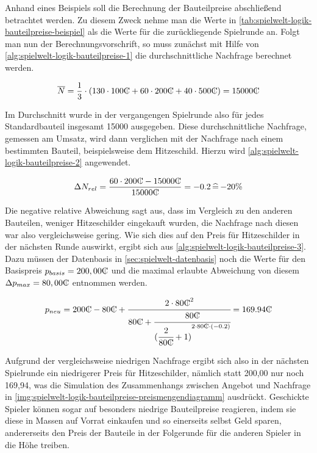 Anhand eines Beispiels soll die Berechnung der Bauteilpreise abschließend betrachtet werden. Zu diesem Zweck nehme man die Werte in \ref{tab:spielwelt-logik-bauteilpreise-beispiel} als die Werte für die zurückliegende Spielrunde an. Folgt man nun der Berechnungsvorschrift, so muss zunächst mit Hilfe von \ref{alg:spielwelt-logik-bauteilpreise-1} die durchschnittliche Nachfrage berechnet werden.

\newcommand{\tc}{\text{\curr}}
\begin{equation}
     \overline{N} = \frac{1}{3} \cdot {(130 \cdot 100 \tc + 60 \cdot 200 \tc + 40 \cdot 500 \tc)} = 15000 \tc \nonumber
\end{equation}

Im Durchschnitt wurde in der vergangengen Spielrunde also für jedes Standardbauteil insgesamt 15000\curr{} ausgegeben. Diese durchschnittliche Nachfrage, gemessen am Umsatz, wird dann verglichen mit der Nachfrage nach einem bestimmten Bauteil, beispielsweise dem Hitzeschild. Hierzu wird \ref{alg:spielwelt-logik-bauteilpreise-2} angewendet.

\begin{equation}
     \Delta{}N_{rel} = \frac{60 \cdot 200 \tc - 15000 \tc}{15000 \tc} = -0.2 \mathop{\widehat{=}} -20\% \nonumber
\end{equation}

Die negative relative Abweichung sagt aus, dass im Vergleich zu den anderen Bauteilen, weniger Hitzeschilder eingekauft wurden, die Nachfrage nach diesen war also vergleichsweise gering. Wie sich dies auf den Preis für Hitzeschilder in der nächsten Runde auswirkt, ergibt sich aus \ref{alg:spielwelt-logik-bauteilpreise-3}. Dazu müssen der Datenbasis in \ref{sec:spielwelt-datenbasis} noch die Werte für den Basispreis $p_{basis} = 200,00\tc$ und die maximal erlaubte Abweichung von diesem $\Delta{}p_{max} = 80,00\tc$ entnommen werden.

\begin{large}
\begin{equation}
     p_{neu} = 200 \tc -80 \tc + \cfrac{2 \cdot 80 \tc^2}{80 \tc + \cfrac{80 \tc}{({\cfrac{2}{80 \tc} + 1)}^{2 \cdot 80 \tc \cdot (-0.2)}}} = 169.94 \tc \nonumber
\end{equation}
\end{large}

Aufgrund der vergleichsweise niedrigen Nachfrage ergibt sich also in der nächsten Spielrunde ein niedrigerer Preis für Hitzeschilder, nämlich statt 200,00\curr{} nur noch 169,94\curr{}, was die Simulation des Zusammenhangs zwischen Angebot und Nachfrage in \ref{img:spielwelt-logik-bauteilpreise-preismengendiagramm} ausdrückt. Geschickte Spieler können sogar auf besonders niedrige Bauteilpreise reagieren, indem sie diese in Massen auf Vorrat einkaufen und so einerseits selbst Geld sparen, andererseits den Preis der Bauteile in der Folgerunde für die anderen Spieler in die Höhe treiben.
